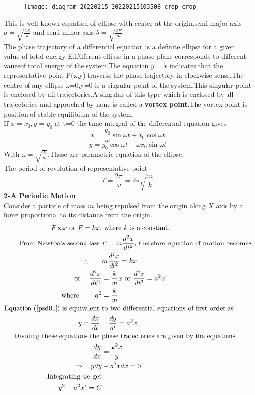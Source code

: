 \begin{figure}[H]
	\centering
	\texttt{[image: diagram-20220215-20220215103508-crop-crop]}
	\caption{}
	\label{}
\end{figure}
This is well known equation of ellipse with center at the origin,semi-major axis $a=\sqrt{\frac{2E}{k}}$ and semi minor axis $b=\sqrt{\frac{2E}{m}}$\\
The phase trajectory of a differential equation is a definite ellipse for a given value of total energy E.Different ellipse in a phase plane corresponds to different vauesof total energy of the system.The equation $y=\dot{x}$ indicates that the representative point P(x,y) traverse the phase trajectory in clockwise sense.The centre of any ellipse x=0,y=0 is a singular point of the system.This singular point is enclosed by all trajectories.A singular of this type which is enclosed by all trajectories and approched by none is called a \textbf{vortex point}.The vortex point is position of stable equilibium of the system.\\
If $x=x_0,y=y_0$ at t=0 the time integral of the differential equation gives\\
$$x=\frac{y_0}{\omega}\sin \omega t+x_0\cos \omega t$$
$$y=y_0\cos \omega t-\omega x_0 \sin \omega t$$ 
With $ \omega=\sqrt{\frac{k}{m}}$.These are parametric equation of the ellipse.\\
The period of revolution of representative point \\
$$T=\frac{2 \pi }{\omega}=2\pi \sqrt{\frac{m}{k}}$$
\textbf{2-A Periodic Motion}\\
Consider a particle of mass $m$ being repulsed from the origin along $X$ axis by a force proportional to its distance from the origin.
\begin{align}
\text{$F \infty x$ or $F=k x$,}&\text{ where $k$ is a constant.}\notag\\
\text{From Newton's second law }&\text{$F=m \frac{d^{2} x}{d t^{2}}$, therefore equation of motlon becomes}\notag\\
\therefore \qquad &m \frac{d^{2} x}{d t^{2}}=k x \notag\\
\text { or } \quad \frac{d^{2} x}{d t^{2}}&=\frac{k}{m} x \text { or } \frac{d^{2} x}{d t^{2}}=a^{2} x\label{psd01}\\
\text{where }\qquad a^{2}&=\frac{k}{m}\notag\\
\text{Equation (\ref{psd01}) is equivalent }&\text{to two differential equations of first order as}\notag\\
y=\frac{d x}{d t}, &\quad \frac{d y}{d t}=a^{2} x\notag\\
\text{Dividing these equations the }&\text{phase trajectories are given by the equations}\notag\\
\frac{d y}{d x} &=\frac{a^{2} x}{y} \notag\\
\Rightarrow \quad y d y &-a^{2} x d x=0\notag\\
\text{Integrating we get}\notag\\
y^{2}-a^{2} x^{2}=C
\end{align}






